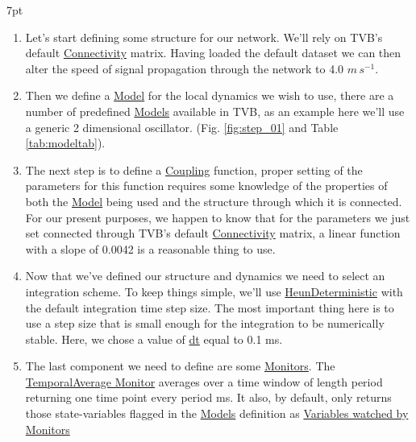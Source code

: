 \documentclass{tufte-handout}
\newenvironment{simulation}{%
  \def\FrameCommand{%
    \hspace{1pt}%
    {\color{ForestGreen}\vrule width 2pt}%
    {\color{simulationshade}\vrule width 4pt}%
    \colorbox{simulationshade}%
  }%
  \MakeFramed{\advance\hsize-\width\FrameRestore}%
  \noindent\hspace{-4.55pt}%
  \begin{adjustwidth}{}{7pt}%
  \vspace{2pt}\vspace{2pt}%
}
{%
  \vspace{2pt}\end{adjustwidth}\endMakeFramed%
}
\begin{document}
\begin{simulation}
\begin{enumerate}
\item Let's start defining some structure for our network. We'll rely on TVB's default \underline{Connectivity} matrix. Having loaded the default dataset we can then alter the speed of signal propagation through the network to 4.0 $m\,s^{-1}$. 

\item Then we define a \underline{Model} for the local dynamics we wish to use, there are a number of predefined \underline{Models} available in TVB, as an example here we'll use a generic 2 dimensional oscillator. (Fig. \ref{fig:step_01}  and Table \ref{tab:modeltab}).

\item The next step is to define a \underline{Coupling} function, proper setting of the parameters for this function requires some knowledge of the properties of both the \underline{Model} being used and the structure through which it is connected. For our present purposes, we happen to know that for the parameters we just set connected through TVB's default \underline{Connectivity} matrix, a linear function with a slope of 0.0042 is a reasonable thing to use. 

\item Now that we've defined our structure and dynamics we need to select an integration scheme. 
To keep things simple, we'll use \underline{HeunDeterministic} with the default integration time step size. The most important thing here is to use a step size that is small enough for the integration to be numerically stable. Here, we chose a value of \underline{dt} equal to 0.1 ms.

\item  The last component we need to define are some \underline{Monitors}. The \underline{TemporalAverage Monitor} averages over a time window of length period returning one time point every period ms. It also, by default, only returns those state-variables flagged in the \underline{Models} definition as \underline{Variables watched by Monitors}
\end{enumerate}
\end{simulation}
\end{document}
